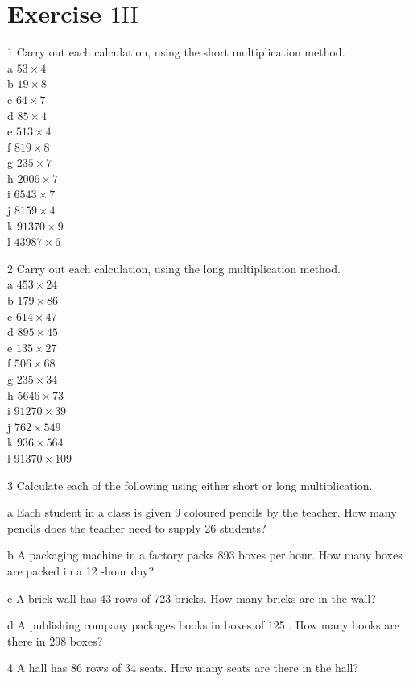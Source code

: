 \documentclass[10pt]{article}
\begin{document}
\section*{Exercise \(1 \mathrm{H}\)}
1 Carry out each calculation, using the short multiplication method.\\
a \(53 \times 4\)\\
b \(19 \times 8\)\\
c \(64 \times 7\)\\
d \(85 \times 4\)\\
e \(513 \times 4\)\\
f \(819 \times 8\)\\
g \(235 \times 7\)\\
h \(2006 \times 7\)\\
i \(6543 \times 7\)\\
j \(8159 \times 4\)\\
k \(91370 \times 9\)\\
l \(43987 \times 6\)

2 Carry out each calculation, using the long multiplication method.\\
a \(453 \times 24\)\\
b \(179 \times 86\)\\
c \(614 \times 47\)\\
d \(895 \times 45\)\\
e \(135 \times 27\)\\
f \(506 \times 68\)\\
g \(235 \times 34\)\\
h \(5646 \times 73\)\\
i \(91270 \times 39\)\\
j \(762 \times 549\)\\
k \(936 \times 564\)\\
l \(91370 \times 109\)

3 Calculate each of the following using either short or long multiplication.

a Each student in a class is given 9 coloured pencils by the teacher. How many pencils does the teacher need to supply 26 students?

b A packaging machine in a factory packs 893 boxes per hour. How many boxes are packed in a 12 -hour day?

c A brick wall has 43 rows of 723 bricks. How many bricks are in the wall?

d A publishing company packages books in boxes of 125 . How many books are there in 298 boxes?

4 A hall has 86 rows of 34 seats. How many seats are there in the hall?
\end{document}
